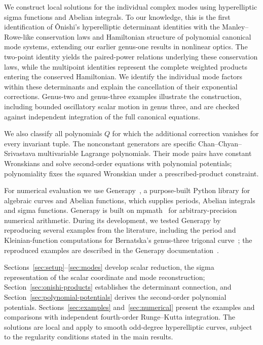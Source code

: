 \documentclass[11pt]{article}
\begin{document}
We construct local solutions for the individual complex modes using hyperelliptic sigma functions and Abelian integrals. To our knowledge, this is the first identification of \^Onishi's hyperelliptic determinant identities with the Manley--Rowe-like conservation laws and Hamiltonian structure of polynomial canonical mode systems, extending our earlier genus-one results in nonlinear optics. The two-point identity yields the paired-power relations underlying these conservation laws, while the multipoint identities represent the complete weighted products entering the conserved Hamiltonian. We identify the individual mode factors within these determinants and explain the cancellation of their exponential corrections. Genus-two and genus-three examples illustrate the construction, including bounded oscillatory scalar motion in genus three, and are checked against independent integration of the full canonical equations.

We also classify all polynomials $Q$ for which the additional correction vanishes for every invariant tuple. The nonconstant generators are specific Chan--Chyan--Srivastava multivariable Lagrange polynomials. Their mode pairs have constant Wronskians and solve second-order equations with polynomial potentials; polynomiality fixes the squared Wronskian under a prescribed-product constraint.

For numerical evaluation we use Generapy~\cite{generapy}, a purpose-built Python library for algebraic curves and Abelian functions, which supplies periods, Abelian integrals and sigma functions. Generapy is built on mpmath~\cite{mpmath} for arbitrary-precision numerical arithmetic. During its development, we tested Generapy by reproducing several examples from the literature, including the period and Kleinian-function computations for Bernatska's genus-three trigonal curve~\cite{bernatska-computation}; the reproduced examples are described in the Generapy documentation~\cite{generapy}.

Sections~\ref{sec:setup}--\ref{sec:modes} develop scalar reduction, the sigma representation of the scalar coordinate and mode reconstruction; Section~\ref{sec:onishi-products} establishes the determinant connection, and Section~\ref{sec:polynomial-potentials} derives the second-order polynomial potentials. Sections~\ref{sec:examples} and~\ref{sec:numerical} present the examples and comparisons with independent fourth-order Runge--Kutta integration. The solutions are local and apply to smooth odd-degree hyperelliptic curves, subject to the regularity conditions stated in the main results.
\end{document}

